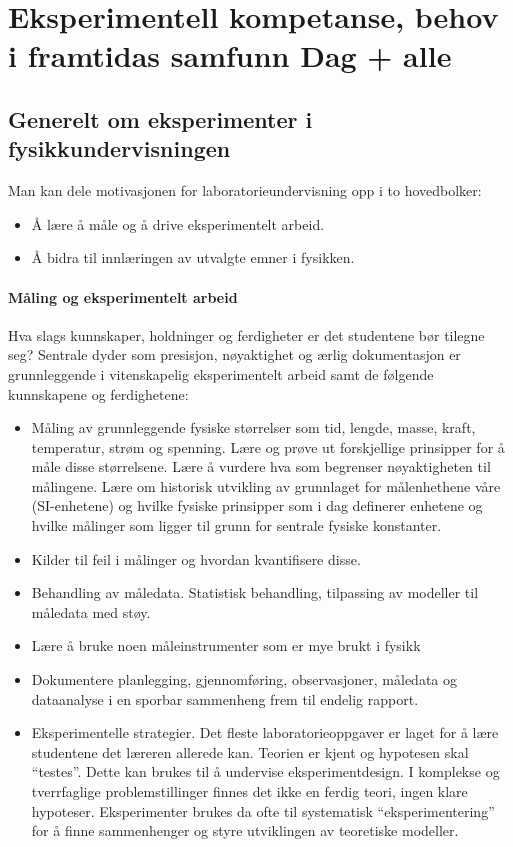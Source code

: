 \documentclass{article}
\begin{document}
\section{Eksperimentell kompetanse, behov i framtidas samfunn {\color{red} Dag + alle}}
\subsection{Generelt om eksperimenter i fysikkundervisningen}
Man kan dele motivasjonen for laboratorieundervisning opp i to hovedbolker:
\begin{itemize}
    \item Å lære å måle og å drive eksperimentelt arbeid.
    \item Å bidra til innlæringen av utvalgte emner i
    fysikken.
\end{itemize}
\paragraph{Måling og eksperimentelt arbeid}
Hva slags kunnskaper, holdninger og ferdigheter er det studentene bør tilegne seg? Sentrale dyder som presisjon, nøyaktighet og ærlig dokumentasjon er grunnleggende i vitenskapelig eksperimentelt arbeid samt de følgende kunnskapene og ferdighetene:
\begin{itemize}
    \item Måling av grunnleggende fysiske størrelser som tid, lengde, masse, kraft, temperatur, strøm og spenning. Lære og prøve ut forskjellige prinsipper for å måle disse størrelsene. Lære å vurdere hva som begrenser nøyaktigheten til målingene. Lære om historisk utvikling av grunnlaget for målenhethene våre (SI-enhetene) og hvilke fysiske prinsipper som i dag definerer enhetene og hvilke målinger som ligger til grunn for sentrale fysiske konstanter.
    \item Kilder til feil i målinger og hvordan kvantifisere disse.
    \item Behandling av måledata. Statistisk behandling, tilpassing av modeller til måledata med støy.
    \item Lære å bruke noen måleinstrumenter som er mye brukt i fysikk
    \item Dokumentere planlegging, gjennomføring, observasjoner, måledata og dataanalyse i en sporbar sammenheng frem til endelig rapport.
    \item Eksperimentelle strategier. Det fleste laboratorieoppgaver er laget for å lære studentene det læreren allerede kan. Teorien er kjent og hypotesen skal ``testes''. Dette kan brukes til å undervise eksperimentdesign. I komplekse og tverrfaglige problemstillinger finnes det ikke en ferdig teori, ingen klare hypoteser. Eksperimenter brukes da ofte til systematisk ``eksperimentering'' for å finne sammenhenger og styre utviklingen av teoretiske modeller. 
\end{itemize}
\end{document}
